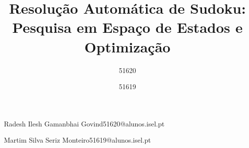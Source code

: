 \def\thetitle{%
 Resolução Automática de Sudoku:\\Pesquisa em Espaço de Estados e Optimização
}
\def\theauthor{%
 RIGG/MSSM
}

\title{ \thetitle }

\author{51620}{Radesh Ilesh Gamanbhai Govind}{51620@alunos.isel.pt}
\author{51619}{Martim Silva Seriz Monteiro}{51619@alunos.isel.pt}


